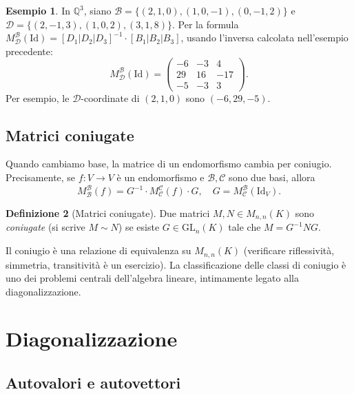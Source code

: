 \documentclass[11pt, a4paper]{book}
\theoremstyle{definition}
\newtheorem{definizione}{Definizione}[section]
\newtheorem{esempio}[definizione]{Esempio}
\theoremstyle{plain}
\theoremstyle{remark}
\newcommand{\Q}{\mathbb{Q}}
\newcommand{\Id}{\mathrm{Id}}
\newcommand{\GL}{\mathrm{GL}}
\begin{document}
\begin{exbox}
\begin{esempio}
In $\Q^3$, siano $\mathcal{B} = \{(2,1,0),(1,0,-1),(0,-1,2)\}$ e $\mathcal{D} = \{(2,-1,3),(1,0,2),(3,1,8)\}$. Per la formula $M^\mathcal{B}_\mathcal{D}(\Id) = [D_1|D_2|D_3]^{-1} \cdot [B_1|B_2|B_3]$, usando l'inversa calcolata nell'esempio precedente:
\[
  M^\mathcal{B}_\mathcal{D}(\Id) = \begin{pmatrix} -6 & -3 & 4 \\ 29 & 16 & -17 \\ -5 & -3 & 3 \end{pmatrix}.
\]
Per esempio, le $\mathcal{D}$-coordinate di $(2,1,0)$ sono $(-6,29,-5)$.
\end{esempio}
\end{exbox}

\subsection{Matrici coniugate}

Quando cambiamo base, la matrice di un endomorfismo cambia per coniugio. Precisamente, se $f \colon V \to V$ è un endomorfismo e $\mathcal{B}, \mathcal{C}$ sono due basi, allora
\[
  M^\mathcal{B}_\mathcal{B}(f) = G^{-1} \cdot M^\mathcal{C}_\mathcal{C}(f) \cdot G, \quad G = M^\mathcal{B}_\mathcal{C}(\Id_V).
\]

\begin{defbox}
\begin{definizione}[Matrici coniugate]
Due matrici $M, N \in M_{n,n}(K)$ sono \emph{coniugate} (si scrive $M \sim N$) se esiste $G \in \GL_n(K)$ tale che $M = G^{-1} N G$.
\end{definizione}
\end{defbox}

Il coniugio è una relazione di equivalenza su $M_{n,n}(K)$ (verificare riflessività, simmetria, transitività è un esercizio). La classificazione delle classi di coniugio è uno dei problemi centrali dell'algebra lineare, intimamente legato alla diagonalizzazione.

\section{Diagonalizzazione}
\label{sec:diag}

\subsection{Autovalori e autovettori}
\end{document}

